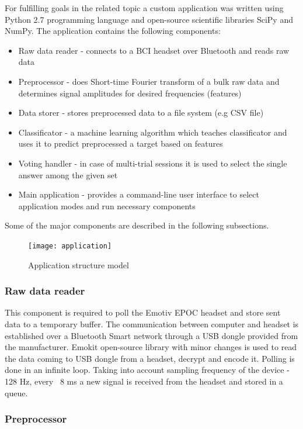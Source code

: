\documentclass[12pt]{article}
\begin{document}
For fulfilling goals in the related topic a custom application was written using Python 2.7 programming language and open-source scientific libraries SciPy\cite{scipy} and NumPy\cite{numpy}. The application contains the following components:
\begin{itemize}
\item Raw data reader - connects to a BCI headset over Bluetooth and reads raw data
\item Preprocessor -  does Short-time Fourier transform of a bulk raw data and determines signal amplitudes for desired frequencies (features)
\item Data storer - stores preprocessed data to a file system (e.g CSV file)
\item Classificator - a machine learning algorithm which teaches classificator and uses it to predict preprocessed a target based on features
\item Voting handler - in case of multi-trial sessions it is used to select the single answer among the given set
\item Main application - provides a command-line user interface to select application modes and run necessary components
\end{itemize}

Some of the major components are described in the following subsections.
\begin{figure} [ht]
\begin{center}
\texttt{[image: application]}
\caption{Application structure model}
\label{fig:fnCompModel}
\end{center}
\end{figure}

\subsubsection{Raw data reader}

This component is required to poll the Emotiv EPOC headset and store sent data to a temporary buffer. The communication between computer and headset is established over a Bluetooth Smart network through a USB dongle provided from the manufacturer. Emokit\cite{emokit} open-source library with minor changes is used to read the data coming to USB dongle from a headset, decrypt and encode it. Polling is done in an infinite loop. Taking into account sampling frequency of the device - 128 Hz, every ~8 ms a new signal is received from the headset and stored in a queue.

\subsubsection{Preprocessor}
\end{document}
